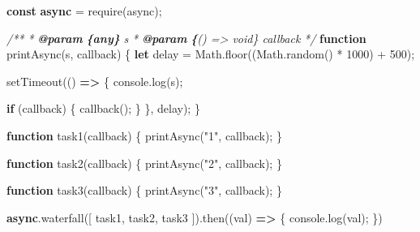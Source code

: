 \documentclass[11pt]{article}
\newenvironment{Shaded}{}{}
\newcommand{\KeywordTok}[1]{\textcolor[rgb]{0.00,0.44,0.13}{\textbf{{#1}}}}
\newcommand{\DecValTok}[1]{\textcolor[rgb]{0.25,0.63,0.44}{{#1}}}
\newcommand{\StringTok}[1]{\textcolor[rgb]{0.25,0.44,0.63}{{#1}}}
\newcommand{\CommentTok}[1]{\textcolor[rgb]{0.38,0.63,0.69}{\textit{{#1}}}}
\newcommand{\FunctionTok}[1]{\textcolor[rgb]{0.02,0.16,0.49}{{#1}}}
\newcommand{\NormalTok}[1]{{#1}}
\newcommand{\AnnotationTok}[1]{\textcolor[rgb]{0.38,0.63,0.69}{\textbf{\textit{{#1}}}}}
\newcommand{\CommentVarTok}[1]{\textcolor[rgb]{0.38,0.63,0.69}{\textbf{\textit{{#1}}}}}
\newcommand{\ControlFlowTok}[1]{\textcolor[rgb]{0.00,0.44,0.13}{\textbf{{#1}}}}
\newcommand{\OperatorTok}[1]{\textcolor[rgb]{0.40,0.40,0.40}{{#1}}}
\newcommand{\BuiltInTok}[1]{{#1}}
\newcommand{\PreprocessorTok}[1]{\textcolor[rgb]{0.74,0.48,0.00}{{#1}}}
\begin{document}
\begin{Shaded}
\begin{Highlighting}[]
\KeywordTok{const} \KeywordTok{async} \OperatorTok{=} \PreprocessorTok{require}\NormalTok{(}\StringTok{\textquotesingle{}async\textquotesingle{}}\NormalTok{)}\OperatorTok{;}

\CommentTok{/**}
\CommentTok{ * }\AnnotationTok{@param}\CommentTok{ }\CommentVarTok{\{any\}}\CommentTok{ s }
\CommentTok{ * }\AnnotationTok{@param}\CommentTok{ }\CommentVarTok{\{}\CommentTok{() =\textgreater{} void\} callback }
\CommentTok{ */}
\KeywordTok{function} \FunctionTok{printAsync}\NormalTok{(s}\OperatorTok{,}\NormalTok{ callback) \{}
    \KeywordTok{let}\NormalTok{ delay }\OperatorTok{=} \BuiltInTok{Math}\OperatorTok{.}\FunctionTok{floor}\NormalTok{((}\BuiltInTok{Math}\OperatorTok{.}\FunctionTok{random}\NormalTok{() }\OperatorTok{*} \DecValTok{1000}\NormalTok{) }\OperatorTok{+} \DecValTok{500}\NormalTok{)}\OperatorTok{;}

    \PreprocessorTok{setTimeout}\NormalTok{(() }\KeywordTok{=\textgreater{}}\NormalTok{ \{}
        \BuiltInTok{console}\OperatorTok{.}\FunctionTok{log}\NormalTok{(s)}\OperatorTok{;}

        \ControlFlowTok{if}\NormalTok{ (callback) \{}
            \FunctionTok{callback}\NormalTok{()}\OperatorTok{;}
\NormalTok{        \}}
\NormalTok{    \}}\OperatorTok{,}\NormalTok{ delay)}\OperatorTok{;}
\NormalTok{\}}

\KeywordTok{function} \FunctionTok{task1}\NormalTok{(callback) \{}
    \FunctionTok{printAsync}\NormalTok{(}\StringTok{"1"}\OperatorTok{,}\NormalTok{ callback)}\OperatorTok{;}
\NormalTok{\}}

\KeywordTok{function} \FunctionTok{task2}\NormalTok{(callback) \{}
    \FunctionTok{printAsync}\NormalTok{(}\StringTok{"2"}\OperatorTok{,}\NormalTok{ callback)}\OperatorTok{;}
\NormalTok{\}}

\KeywordTok{function} \FunctionTok{task3}\NormalTok{(callback) \{}
    \FunctionTok{printAsync}\NormalTok{(}\StringTok{"3"}\OperatorTok{,}\NormalTok{ callback)}\OperatorTok{;}
\NormalTok{\}}

\KeywordTok{async}\OperatorTok{.}\FunctionTok{waterfall}\NormalTok{([}
\NormalTok{    task1}\OperatorTok{,}
\NormalTok{    task2}\OperatorTok{,}
\NormalTok{    task3}
\NormalTok{])}\OperatorTok{.}\FunctionTok{then}\NormalTok{((val) }\KeywordTok{=\textgreater{}}\NormalTok{ \{}
    \BuiltInTok{console}\OperatorTok{.}\FunctionTok{log}\NormalTok{(val)}\OperatorTok{;}
\NormalTok{\})}
\end{Highlighting}
\end{Shaded}
\end{document}
